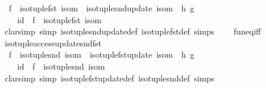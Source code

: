 \begin{isabellebody}
\ \ {\isachardoublequoteopen}{\isacharparenleft}{\kern0pt}f\ {\isasymcirc}\ iso{\isacharunderscore}{\kern0pt}tuple{\isacharunderscore}{\kern0pt}fst\ isom{\isacharparenright}{\kern0pt}\ {\isasymcirc}\ {\isacharparenleft}{\kern0pt}iso{\isacharunderscore}{\kern0pt}tuple{\isacharunderscore}{\kern0pt}snd{\isacharunderscore}{\kern0pt}update\ isom\ {\isasymcirc}\ h{\isacharparenright}{\kern0pt}\ g\ {\isacharequal}{\kern0pt}\isanewline
\ \ \ \ id\ {\isasymcirc}\ {\isacharparenleft}{\kern0pt}f\ {\isasymcirc}\ iso{\isacharunderscore}{\kern0pt}tuple{\isacharunderscore}{\kern0pt}fst\ isom{\isacharparenright}{\kern0pt}{\isachardoublequoteclose}\isanewline
%
\isadelimproof
\ \ %
\endisadelimproof
%
\isatagproof
{}\isamarkupfalse%
\ {\isacharparenleft}{\kern0pt}clarsimp\ simp{\isacharcolon}{\kern0pt}\ iso{\isacharunderscore}{\kern0pt}tuple{\isacharunderscore}{\kern0pt}snd{\isacharunderscore}{\kern0pt}update{\isacharunderscore}{\kern0pt}def\ iso{\isacharunderscore}{\kern0pt}tuple{\isacharunderscore}{\kern0pt}fst{\isacharunderscore}{\kern0pt}def\ simps\isanewline
\ \ \ \ fun{\isacharunderscore}{\kern0pt}eq{\isacharunderscore}{\kern0pt}iff{\isacharparenright}{\kern0pt}%
\endisatagproof
{\isafoldproof}%
%
\isadelimproof
\isanewline
%
\endisadelimproof
\isanewline
{}\isamarkupfalse%
\ iso{\isacharunderscore}{\kern0pt}tuple{\isacharunderscore}{\kern0pt}access{\isacharunderscore}{\kern0pt}update{\isacharunderscore}{\kern0pt}snd{\isacharunderscore}{\kern0pt}fst{\isacharcolon}{\kern0pt}\isanewline
\ \ {\isachardoublequoteopen}{\isacharparenleft}{\kern0pt}f\ {\isasymcirc}\ iso{\isacharunderscore}{\kern0pt}tuple{\isacharunderscore}{\kern0pt}snd\ isom{\isacharparenright}{\kern0pt}\ {\isasymcirc}\ {\isacharparenleft}{\kern0pt}iso{\isacharunderscore}{\kern0pt}tuple{\isacharunderscore}{\kern0pt}fst{\isacharunderscore}{\kern0pt}update\ isom\ {\isasymcirc}\ h{\isacharparenright}{\kern0pt}\ g\ {\isacharequal}{\kern0pt}\isanewline
\ \ \ \ id\ {\isasymcirc}\ {\isacharparenleft}{\kern0pt}f\ {\isasymcirc}\ iso{\isacharunderscore}{\kern0pt}tuple{\isacharunderscore}{\kern0pt}snd\ isom{\isacharparenright}{\kern0pt}{\isachardoublequoteclose}\isanewline
%
\isadelimproof
\ \ %
\endisadelimproof
%
\isatagproof
{}\isamarkupfalse%
\ {\isacharparenleft}{\kern0pt}clarsimp\ simp{\isacharcolon}{\kern0pt}\ iso{\isacharunderscore}{\kern0pt}tuple{\isacharunderscore}{\kern0pt}fst{\isacharunderscore}{\kern0pt}update{\isacharunderscore}{\kern0pt}def\ iso{\isacharunderscore}{\kern0pt}tuple{\isacharunderscore}{\kern0pt}snd{\isacharunderscore}{\kern0pt}def\ simps\isanewline

\end{isabellebody}
